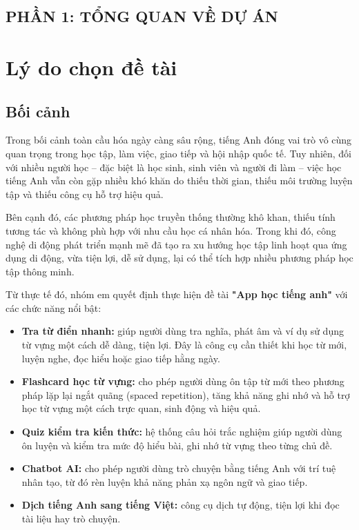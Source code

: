 \begin{center}
\section*{PHẦN 1: TỔNG QUAN VỀ DỰ ÁN}
\end{center}

\section{Lý do chọn đề tài}

\subsection{Bối cảnh}
Trong bối cảnh toàn cầu hóa ngày càng sâu rộng, tiếng Anh đóng vai trò vô cùng quan trọng trong học tập, làm việc, giao tiếp và hội nhập quốc tế. Tuy nhiên, đối với nhiều người học – đặc biệt là học sinh, sinh viên và người đi làm – việc học tiếng Anh vẫn còn gặp nhiều khó khăn do thiếu thời gian, thiếu môi trường luyện tập và thiếu công cụ hỗ trợ hiệu quả.

Bên cạnh đó, các phương pháp học truyền thống thường khô khan, thiếu tính tương tác và không phù hợp với nhu cầu học cá nhân hóa. Trong khi đó, công nghệ di động phát triển mạnh mẽ đã tạo ra xu hướng học tập linh hoạt qua ứng dụng di động, vừa tiện lợi, dễ sử dụng, lại có thể tích hợp nhiều phương pháp học tập thông minh.

Từ thực tế đó, nhóm em quyết định thực hiện đề tài \textbf{"App học tiếng anh"} với các chức năng nổi bật:
\begin{itemize}
    \item \textbf{Tra từ điển nhanh:} giúp người dùng tra nghĩa, phát âm và ví dụ sử dụng từ vựng một cách dễ dàng, tiện lợi. Đây là công cụ cần thiết khi học từ mới, luyện nghe, đọc hiểu hoặc giao tiếp hằng ngày.
    \item \textbf{Flashcard học từ vựng:} cho phép người dùng ôn tập từ mới theo phương pháp lặp lại ngắt quãng (spaced repetition), tăng khả năng ghi nhớ và hỗ trợ học từ vựng một cách trực quan, sinh động và hiệu quả.
     \item \textbf{Quiz kiểm tra kiến thức: }hệ thống câu hỏi trắc nghiệm giúp người dùng ôn luyện và kiểm tra mức độ hiểu bài, ghi nhớ từ vựng theo từng chủ đề.
     \item \textbf{Chatbot AI: }cho phép người dùng trò chuyện bằng tiếng Anh với trí tuệ nhân tạo, từ đó rèn luyện khả năng phản xạ ngôn ngữ và giao tiếp.
     \item \textbf{Dịch tiếng Anh sang tiếng Việt: } công cụ dịch tự động, tiện lợi khi đọc tài liệu hay trò chuyện.
\end{itemize}

